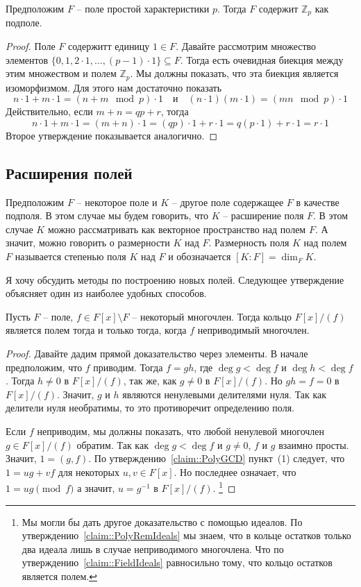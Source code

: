 \begin{claim}
\label{claim::PrimeSubfieldCharP}
Предположим $F$ -- поле простой характеристики $p$.
Тогда $F$ содержит $\mathbb Z_p$ как подполе.
\end{claim}
\begin{proof}
Поле $F$ содержитт единицу $1\in F$.
Давайте рассмотрим множество элементов $\{0, 1, 2\cdot 1, \ldots , (p-1)\cdot 1\}\subseteq F$.
Тогда есть очевидная биекция между этим множеством и полем $\mathbb Z_p$.
Мы должны показать, что эта биекция является изоморфизмом.
Для этого нам достаточно показать
\[
n\cdot 1 + m \cdot 1 = (n+m\!\!\mod p)\cdot 1\quad\text{и}\quad
(n\cdot 1)(m\cdot 1) = (mn\!\!\mod p)\cdot 1
\]
Действительно, если $m+n = qp + r$, тогда
\[
n\cdot 1 + m \cdot 1 = (m+n)\cdot 1 = (qp) \cdot 1 + r\cdot 1 = q(p \cdot 1) + r\cdot 1 = r\cdot 1
\]
Второе утверждение показывается аналогично.
\end{proof}

\subsection{Расширения полей}

Предположим $F$ -- некоторое поле и $K$ -- другое поле содержащее $F$ в качестве подполя.
В этом случае мы будем говорить, что $K$ -- расширение поля $F$.
В этом случае $K$ можно рассматривать как векторное пространство над полем $F$.
А значит, можно говорить о размерности $K$ над $F$.
Размерность поля $K$ над полем $F$ называется степенью поля $K$ над $F$ и обозначается $[K:F] = \dim_F K$.

Я хочу обсудить методы по построению новых полей.
Следующее утверждение объясняет один из наиболее удобных способов.

\begin{claim}
\label{claim::PolyQuotField}
Пусть $F$ -- поле, $f\in F[x]\setminus F$ -- некоторый многочлен.
Тогда кольцо $F[x]/(f)$ является полем тогда и только тогда, когда $f$ неприводимый многочлен.
\end{claim}
\begin{proof}
Давайте дадим прямой доказательство через элементы.
В начале предположим, что $f$ приводим.
Тогда $f = gh$, где $\deg g < \deg f$ и $\deg h < \deg f$.
Тогда $h\neq 0$ в $F[x]/(f)$, так же, как $g\neq 0$ в $F[x]/(f)$.
Но $gh = f = 0$ в $F[x]/(f)$.
Значит, $g$ и $h$ являются ненулевыми делителями нуля.
Так как делители нуля необратимы, то это противоречит определению поля.

Если $f$ неприводим, мы должны показать, что любой ненулевой многочлен $g\in F[x]/(f)$ обратим.
Так как $\deg g < \deg f$ и $g\neq 0$, $f$ и $g$ взаимно просты.
Значит, $1 = (g, f)$.
По утверждению~\ref{claim::PolyGCD} пункт~(1) следует, что $1 = ug + vf$ для некоторых $u,v\in F[x]$.
Но последнее означает, что $1 = ug\pmod f$ а значит, $u = g^{-1}$ в $F[x]/(f)$.%
\footnote{Мы могли бы дать другое доказательство с помощью идеалов.
По утверждению~\ref{claim::PolyRemIdeals} мы знаем, что в кольце остатков только два идеала лишь в случае неприводимого многочлена.
Что по утверждению~\ref{claim::FieldIdeals} равносильно тому, что кольцо остатков является полем.}
\end{proof}

